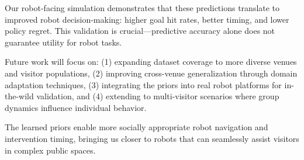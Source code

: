 \documentclass[letterpaper]{article}
\begin{document}
Our robot-facing simulation demonstrates that these predictions translate to improved robot decision-making: higher goal hit rates, better timing, and lower policy regret. This validation is crucial—predictive accuracy alone does not guarantee utility for robot tasks.

Future work will focus on: (1) expanding dataset coverage to more diverse venues and visitor populations, (2) improving cross-venue generalization through domain adaptation techniques, (3) integrating the priors into real robot platforms for in-the-wild validation, and (4) extending to multi-visitor scenarios where group dynamics influence individual behavior.

The learned priors enable more socially appropriate robot navigation and intervention timing, bringing us closer to robots that can seamlessly assist visitors in complex public spaces.
\end{document}
